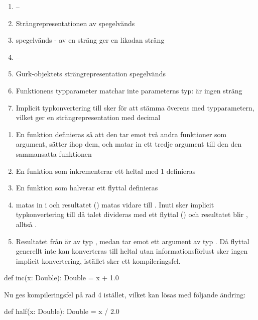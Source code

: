 \Task     %

\Subtask  \begin{enumerate}
\item --
\item Strängrepresentationen av  spegelvänds
\item {} spegelvänds -  av en sträng ger en likadan sträng
\item --
\item Gurk-objektets strängrepresentation spegelvänds
\item Funktionens typparameter matchar inte parameterns typ:  är ingen sträng
\item Implicit typkonvertering till  sker för att stämma överens med typparametern, vilket ger en strängrepresentation med decimal
\end{enumerate}

\Subtask  \begin{enumerate}
\item En funktion definieras så att den tar emot två andra funktioner som argument, sätter ihop dem, och matar in ett tredje argument till den den sammansatta funktionen
\item En funktion som inkrementerar ett heltal med 1 definieras
\item En funktion som halverar ett flyttal definieras
\item {} matas in i  och resultatet () matas vidare till . Inuti  sker implicit typkonvertering till  då talet divideras med ett flyttal () och resultatet blir , alltså .
\item Resultatet från  är av typ , medan  tar emot ett argument av typ . Då flyttal generellt inte kan konverteras till heltal utan informationsförlust sker ingen implicit konvertering, istället sker ett kompileringsfel.
\end{enumerate}

\Subtask \begin{Code}
def inc(x: Double): Double = x + 1.0 
\end{Code}
Nu ges kompileringsfel på rad 4 istället, vilket kan lösas med följande ändring:
\begin{Code}
def half(x: Double): Double = x / 2.0 
\end{Code}


